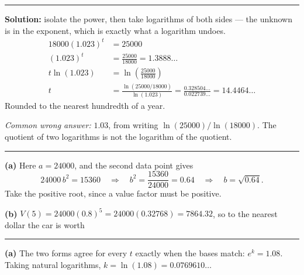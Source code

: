 \documentclass[12pt]{article}
\begin{document}
\vspace{0.2cm}\noindent\rule{\linewidth}{0.2pt}\vspace{0.2cm}


\textbf{Solution:} isolate the power, then take logarithms of both sides --- the unknown is in the exponent, which is exactly what a logarithm undoes.
\begin{align*}
  18000(1.023)^t &= 25000 \\
  (1.023)^t &= \frac{25000}{18000} = 1.3888\ldots \\
  t\ln(1.023) &= \ln\!\left(\frac{25000}{18000}\right) \\
  t &= \frac{\ln(25000/18000)}{\ln(1.023)} = \frac{0.328504\ldots}{0.022739\ldots} = 14.4464\ldots
\end{align*}
Rounded to the nearest hundredth of a year. 

\smallskip
\noindent\textit{Common wrong answer:} $1.03$, from writing $\ln(25000)/\ln(18000)$. The quotient of two logarithms is not the logarithm of the quotient.

\vspace{0.2cm}\noindent\rule{\linewidth}{0.2pt}\vspace{0.2cm}


\textbf{(a)} Here $a = 24000$, and the second data point gives
\[ 24000\,b^{2} = 15360 \quad\Longrightarrow\quad b^{2} = \frac{15360}{24000} = 0.64 \quad\Longrightarrow\quad b = \sqrt{0.64}. \]
Take the positive root, since a value factor must be positive. 

\textbf{(b)} $V(5) = 24000(0.8)^{5} = 24000(0.32768) = 7864.32$, so to the nearest dollar the car is worth 

\vspace{0.2cm}\noindent\rule{\linewidth}{0.2pt}\vspace{0.2cm}


\textbf{(a)} The two forms agree for every $t$ exactly when the bases match: $e^{k} = 1.08$. Taking natural logarithms, $k = \ln(1.08) = 0.0769610\ldots$ 
\end{document}
